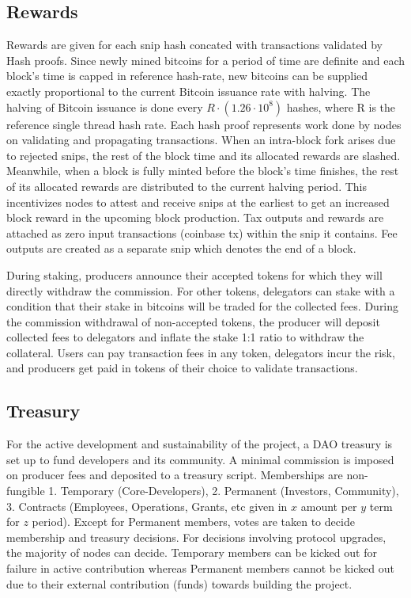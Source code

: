\documentclass[a4paper,	10pt]{extarticle}
\begin{document}
\subsection{Rewards}
Rewards are given for each snip hash concated with transactions validated by Hash proofs. Since newly mined bitcoins for a period of time are definite and each block's time is capped in reference hash-rate, new bitcoins can be supplied exactly proportional to the current Bitcoin issuance rate with halving. The halving of Bitcoin issuance is done every $R \cdot (1.26 \cdot 10^8)$ hashes, where R is the reference single thread hash rate. Each hash proof represents work done by nodes on validating and propagating transactions. When an intra-block fork arises due to rejected snips, the rest of the block time and its allocated rewards are slashed. Meanwhile, when a block is fully minted before the block's time finishes, the rest of its allocated rewards are distributed to the current halving period. This incentivizes nodes to attest and receive snips at the earliest to get an increased block reward in the upcoming block production. Tax outputs and rewards are attached as zero input transactions (coinbase tx) within the snip it contains. Fee outputs are created as a separate snip which denotes the end of a block.

During staking, producers announce their accepted tokens for which they will directly withdraw the commission. For other tokens, delegators can stake with a condition that their stake in bitcoins will be traded for the collected fees. During the commission withdrawal of non-accepted tokens, the producer will deposit collected fees to delegators and inflate the stake 1:1 ratio to withdraw the collateral. Users can pay transaction fees in any token, delegators incur the risk, and producers get paid in tokens of their choice to validate transactions.
\subsection{Treasury}
For the active development and sustainability of the project, a DAO treasury is set up to fund developers and its community. A minimal commission is imposed on producer fees and deposited to a treasury script. Memberships are non-fungible 1. Temporary (Core-Developers), 2. Permanent (Investors, Community), 3. Contracts (Employees, Operations, Grants, etc given in $x$ amount per $y$ term for $z$ period). Except for Permanent members, votes are taken to decide membership and treasury decisions. For decisions involving protocol upgrades, the majority of nodes can decide. Temporary members can be kicked out for failure in active contribution whereas Permanent members cannot be kicked out due to their external contribution (funds) towards building the project.
\end{document}
